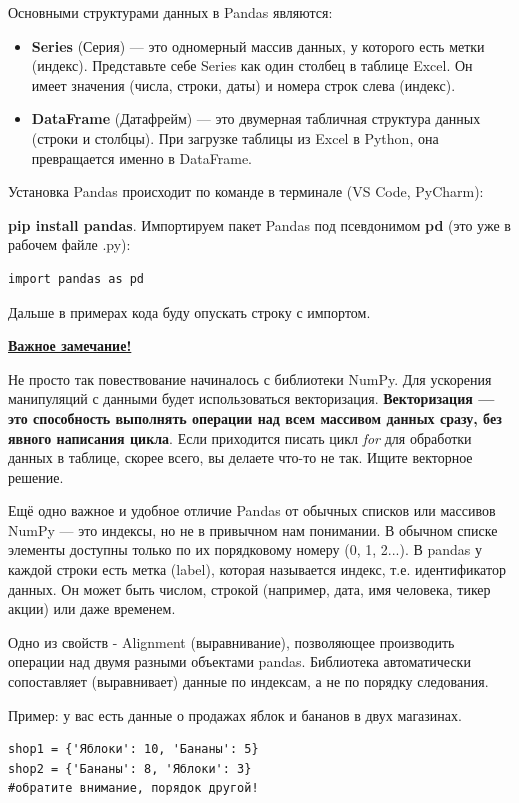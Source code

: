 \documentclass[pract]{SCWorks}
\begin{document}
Основными структурами данных в Pandas являются:

\begin{itemize}
    \item \textbf{Series} (Серия) — это одномерный массив данных, 
    у которого есть метки (индекс).
    Представьте себе Series как один столбец в таблице Excel. Он имеет значения (числа, строки, даты) и 
    номера строк слева (индекс).
    \item \textbf{DataFrame} (Датафрейм) — это двумерная табличная структура данных (строки и столбцы).
    При загрузке таблицы из Excel в Python, она превращается именно в DataFrame.
\end{itemize}


Установка Pandas происходит по команде в терминале (VS Code, PyCharm): 

\textbf{pip install pandas}. 
Импортируем пакет Pandas под псевдонимом \textbf{pd} (это уже в рабочем файле .py):
\begin{verbatim}
import pandas as pd  
\end{verbatim}
Дальше в примерах кода буду опускать строку с импортом.

\textbf{\underline{Важное замечание!}}

Не просто так повествование начиналось с библиотеки NumPy. Для ускорения манипуляций с данными будет использоваться
векторизация. \textbf{Векторизация — это способность выполнять операции над всем массивом 
данных сразу, без явного написания цикла}.
Если приходится писать цикл \textit{for} для обработки данных в таблице, скорее всего, вы делаете что-то 
не так. Ищите векторное решение.

Ещё одно важное и удобное отличие Pandas от обычных списков или массивов NumPy — это индексы, но не 
в привычном нам понимании.
В обычном списке элементы доступны только по их порядковому номеру (0, 1, 2...). В pandas у каждой строки 
есть метка (label), которая называется индекс, т.е. идентификатор данных. 
Он может быть числом, строкой (например, дата, имя человека, тикер акции) или даже временем.

Одно из свойств - Alignment (выравнивание), позволяющее производить операции над двумя разными объектами pandas. 
Библиотека автоматически сопоставляет (выравнивает) данные по индексам, а не по порядку следования.

Пример: у вас есть данные о продажах яблок и бананов в двух магазинах.

\begin{verbatim}
shop1 = {'Яблоки': 10, 'Бананы': 5}
shop2 = {'Бананы': 8, 'Яблоки': 3}
#обратите внимание, порядок другой!
\end{verbatim}
\end{document}
